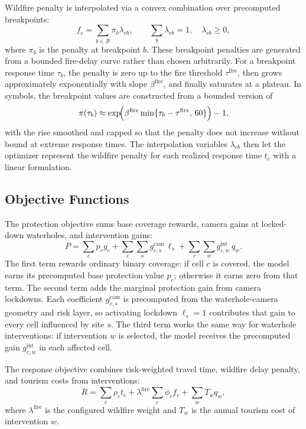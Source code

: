 Wildfire penalty is interpolated via a convex combination over precomputed breakpoints:
\[
f_c = \sum_{b \in \mathcal{B}} \pi_b \lambda_{cb},
\qquad
\sum_{b} \lambda_{cb} = 1,
\quad
\lambda_{cb} \ge 0,
\]
where $\pi_b$ is the penalty at breakpoint $b$. These breakpoint penalties are generated from a bounded fire-delay curve rather than chosen arbitrarily. For a breakpoint response time $\tau_b$, the penalty is zero up to the fire threshold $\tau^{\mathrm{fire}}$, then grows approximately exponentially with slope $\beta^{\mathrm{fire}}$, and finally saturates at a plateau. In symbols, the breakpoint values are constructed from a bounded version of
\[
\pi(\tau_b) \approx \exp\!\Bigl(\beta^{\mathrm{fire}} \min\{\tau_b-\tau^{\mathrm{fire}},\,60\}\Bigr) - 1,
\]
with the rise smoothed and capped so that the penalty does not increase without bound at extreme response times. The interpolation variables $\lambda_{cb}$ then let the optimizer represent the wildfire penalty for each realized response time $t_c$ with a linear formulation.

\subsection{Objective Functions}

The protection objective sums base coverage rewards, camera gains at locked-down waterholes, and intervention gains:
\[
P
=
\sum_c p_c y_c
+
\sum_c \sum_s g^{\mathrm{cam}}_{c,s}\,\ell_s
+
\sum_c \sum_w g^{\mathrm{int}}_{c,w}\,q_w.
\]
The first term rewards ordinary binary coverage: if cell $c$ is covered, the model earns its precomputed base protection value $p_c$; otherwise it earns zero from that term. The second term adds the marginal protection gain from camera lockdowns. Each coefficient $g^{\mathrm{cam}}_{c,s}$ is precomputed from the waterhole-camera geometry and risk layer, so activating lockdown $\ell_s = 1$ contributes that gain to every cell influenced by site $s$. The third term works the same way for waterhole interventions: if intervention $w$ is selected, the model receives the precomputed gain $g^{\mathrm{int}}_{c,w}$ in each affected cell.

The response objective combines risk-weighted travel time, wildfire delay penalty, and tourism costs from interventions:
\[
R
=
\sum_c \rho_c t_c
+
\lambda^{\mathrm{fire}} \sum_c \phi_c f_c
+
\sum_w T_w q_w,
\]
where $\lambda^{\mathrm{fire}}$ is the configured wildfire weight and $T_w$ is the annual tourism cost of intervention $w$.

